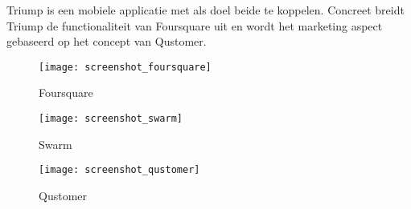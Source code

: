Triump is een mobiele applicatie met als doel beide te koppelen.
Concreet breidt Triump de functionaliteit van Foursquare uit en wordt het marketing aspect gebaseerd op het concept van Qustomer.
\begin{figure}[ht]
\begin{minipage}[b]{0.25\linewidth}
\centering
\texttt{[image: screenshot\_foursquare]}
\caption{Foursquare}
\label{fig:screenshot_foursquare}
\end{minipage}
\hspace{1.5cm}
\begin{minipage}[b]{0.25\linewidth}
\centering
\texttt{[image: screenshot\_swarm]}
\caption{Swarm}
\label{fig:screenshot_swarm}
\end{minipage}
\hspace{1.5cm}
\begin{minipage}[b]{0.25\linewidth}
\centering
\texttt{[image: screenshot\_qustomer]}
\caption{Qustomer}
\label{fig:screenshot_qustomer}
\end{minipage}
\end{figure}

